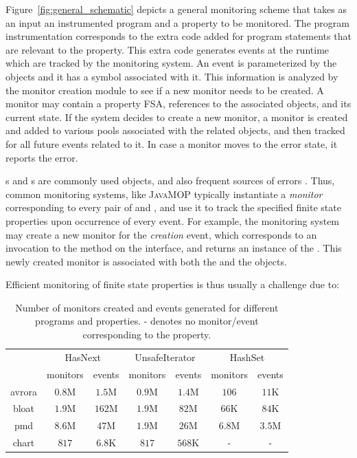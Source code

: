 Figure~\ref{fig:general_schematic} depicts a general monitoring scheme that takes as 
an input an instrumented program and a property to be monitored. The program
instrumentation corresponds to the extra code added for program statements 
that are relevant to the property. This extra code generates events at the runtime
which are tracked by the monitoring system. An event is parameterized by
the objects and it has a symbol associated with it. This information is analyzed
by the monitor creation module to see if a new monitor needs to be created. A
monitor may contain a property FSA, references to the associated objects, and its
current state. If the system decides to create a new monitor, a monitor is created
and added to various pools
associated with the related objects, and then tracked for all future events
related to it. In case a monitor moves to the error state, it reports the error.

s and s are commonly used objects, and also 
frequent sources of errors \cite{}. Thus, common monitoring systems, like 
\textsc{JavaMOP} typically instantiate a \textit{monitor} corresponding to every 
pair of  and , and use it to track the 
specified finite state properties upon occurrence of every event. For example, 
the monitoring system may create a new monitor for the \textit{creation} event, 
which corresponds to an invocation to the  method on the 
 interface, and returns an instance of the .
This newly created monitor is associated with both the  and 
the  objects.

 Efficient monitoring of finite state properties is 
thus usually a challenge due to:

\begin{table}[t]
\centering
\small
\begin{tabular}{|c|c|c|c|c|c|c|}
\hline
\multirow{2}{*}{} & \multicolumn{2}{c|}{HasNext} & 
\multicolumn{2}{c|}{UnsafeIterator} & \multicolumn{2}{c|}{HashSet}\\
\cline{2-7} 
                  & monitors     & events        & monitors         & events   
                  & monitors         & events \\ \hline
avrora      & $0.8$M & $1.5$M  & $0.9$M  & $1.4$M  & $106$ & $11$K \\\hline 
bloat   & $1.9$M  & $162$M & $1.9$M  & $82$M   &$66$K& $84$K  \\\hline 
pmd  & $8.6$M      & $47$M      & $1.9$M    & $26$M & $6.8$M & $3.5$M\\ \hline
chart  & $817$ & $6.8$K    &  $817$  & $568$K & - & -\\ \hline
\end{tabular}
\caption{Number of monitors created and events generated for different programs 
and properties. - denotes no monitor/event corresponding to the property.
}
\end{table}
\label{table:numofmonitors}

